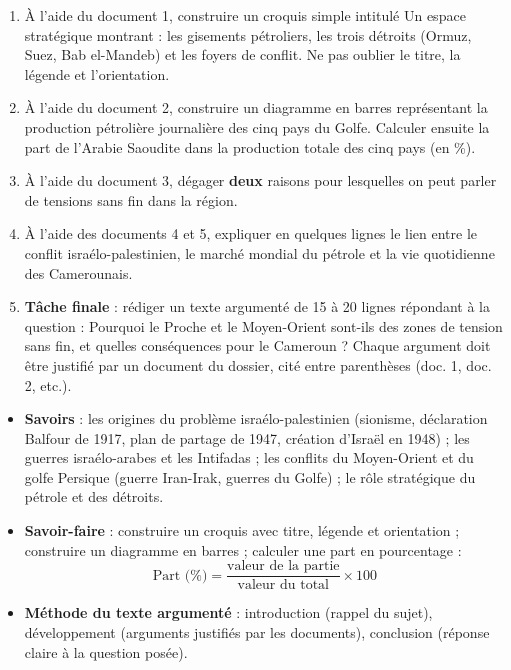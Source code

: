 \documentclass[11pt]{article}
\newcommand{\cle}[1]{{\popxbold\color{popdark}#1}}
\newcounter{popsec}
\newcounter{popsub}
\newcommand{\courssub}[1]{%
  \stepcounter{popsub}%
  \par\vspace{9pt}\noindent{\popxbold\fontsize{11.5}{13}\selectfont\color{popink}{\color{poporange}\thepopsec.\thepopsub}\hspace{6pt}#1}\par\nopagebreak\vspace{4pt}
}
\begin{document}
\begin{enumerate}
\item À l'aide du document 1, construire un \cle{croquis} simple intitulé \og Un espace stratégique \fg{} montrant : les gisements pétroliers, les trois détroits (Ormuz, Suez, Bab el-Mandeb) et les foyers de conflit. Ne pas oublier le titre, la légende et l'orientation.
\item À l'aide du document 2, construire un \cle{diagramme en barres} représentant la production pétrolière journalière des cinq pays du Golfe. Calculer ensuite la part de l'Arabie Saoudite dans la production totale des cinq pays (en \%).
\item À l'aide du document 3, dégager \textbf{deux} raisons pour lesquelles on peut parler de tensions \og sans fin \fg{} dans la région.
\item À l'aide des documents 4 et 5, expliquer en quelques lignes le lien entre le conflit israélo-palestinien, le marché mondial du pétrole et la vie quotidienne des Camerounais.
\item \textbf{Tâche finale} : rédiger un texte argumenté de 15 à 20 lignes répondant à la question : \og Pourquoi le Proche et le Moyen-Orient sont-ils des zones de tension sans fin, et quelles conséquences pour le Cameroun ? \fg{} Chaque argument doit être justifié par un document du dossier, cité entre parenthèses (doc. 1, doc. 2, etc.).
\end{enumerate}

\courssub{Ressources à mobiliser}

\begin{itemize}
\item \textbf{Savoirs} : les origines du problème israélo-palestinien (sionisme, déclaration Balfour de 1917, plan de partage de 1947, création d'Israël en 1948) ; les guerres israélo-arabes et les Intifadas ; les conflits du Moyen-Orient et du golfe Persique (guerre Iran-Irak, guerres du Golfe) ; le rôle stratégique du pétrole et des détroits.
\item \textbf{Savoir-faire} : construire un croquis avec titre, légende et orientation ; construire un diagramme en barres ; calculer une part en pourcentage :
\[ \text{Part (\%)} = \frac{\text{valeur de la partie}}{\text{valeur du total}} \times 100 \]
\item \textbf{Méthode du texte argumenté} : introduction (rappel du sujet), développement (arguments justifiés par les documents), conclusion (réponse claire à la question posée).
\end{itemize}
\end{document}

